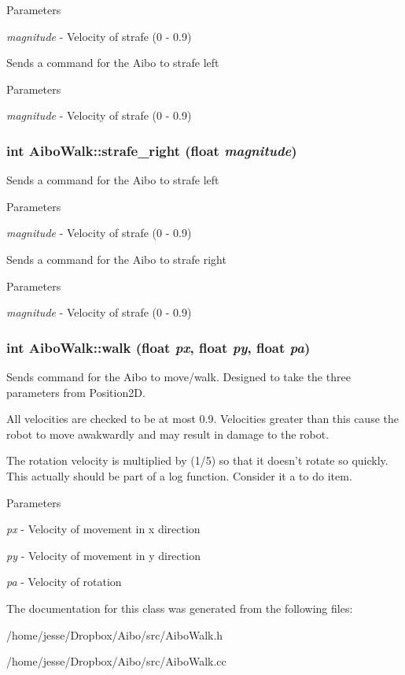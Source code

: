 \begin{DoxyParams}{Parameters}
\item[{\em magnitude}]-\/ Velocity of strafe (0 -\/ 0.9)\end{DoxyParams}
Sends a command for the Aibo to strafe left 
\begin{DoxyParams}{Parameters}
\item[{\em magnitude}]-\/ Velocity of strafe (0 -\/ 0.9) \end{DoxyParams}
\hypertarget{classAiboWalk_a092f290abad06d247dab8d4d602c5f73}{
\subsubsection[{strafe\_\-right}]{\setlength{\rightskip}{0pt plus 5cm}int AiboWalk::strafe\_\-right (float {\em magnitude})}}
\label{classAiboWalk_a092f290abad06d247dab8d4d602c5f73}
Sends a command for the Aibo to strafe left 
\begin{DoxyParams}{Parameters}
\item[{\em magnitude}]-\/ Velocity of strafe (0 -\/ 0.9)\end{DoxyParams}
Sends a command for the Aibo to strafe right 
\begin{DoxyParams}{Parameters}
\item[{\em magnitude}]-\/ Velocity of strafe (0 -\/ 0.9) \end{DoxyParams}
\hypertarget{classAiboWalk_ace69bca076d0091769b1af5ca7636953}{
\subsubsection[{walk}]{\setlength{\rightskip}{0pt plus 5cm}int AiboWalk::walk (float {\em px}, \/  float {\em py}, \/  float {\em pa})}}
\label{classAiboWalk_ace69bca076d0091769b1af5ca7636953}
Sends command for the Aibo to move/walk. Designed to take the three parameters from Position2D.

All velocities are checked to be at most 0.9. Velocities greater than this cause the robot to move awakwardly and may result in damage to the robot.

The rotation velocity is multiplied by (1/5) so that it doesn't rotate so quickly. This actually should be part of a log function. Consider it a to do item.


\begin{DoxyParams}{Parameters}
\item[{\em px}]-\/ Velocity of movement in x direction \item[{\em py}]-\/ Velocity of movement in y direction \item[{\em pa}]-\/ Velocity of rotation \end{DoxyParams}


The documentation for this class was generated from the following files:\begin{DoxyCompactItemize}
\item 
/home/jesse/Dropbox/Aibo/src/AiboWalk.h\item 
/home/jesse/Dropbox/Aibo/src/AiboWalk.cc\end{DoxyCompactItemize}
